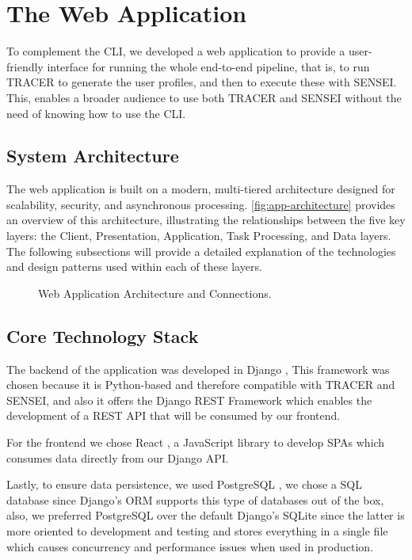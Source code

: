 \section{The Web Application}

To complement the \ac{CLI},
we developed a web application
to provide a user-friendly interface for running the whole end-to-end pipeline,
that is, to run \ac{TRACER} to generate the user profiles,
and then to execute these with SENSEI.
This, enables a broader audience to use both \ac{TRACER} and SENSEI
without the need of knowing how to use the \ac{CLI}.

\subsection{System Architecture}

The web application is built on a modern,
multi-tiered architecture designed for scalability, security, and asynchronous processing.
\autoref{fig:app-architecture} provides an overview of this architecture,
illustrating the relationships between the five key layers:
the Client, Presentation, Application, Task Processing, and Data layers.
The following subsections will provide a detailed explanation
of the technologies and design patterns used within each of these layers.

\begin{figure}[!htbp]
    \centering
    
    \caption{Web Application Architecture and Connections.}
    \label{fig:app-architecture}
\end{figure}

\subsection{Core Technology Stack}

The backend of the application was developed in Django \autocite{Django},
This framework was chosen because it is Python-based
and therefore compatible with \ac{TRACER} and SENSEI,
and also it offers the Django REST Framework \autocite{DjangoRESTFramework}
which enables the development of a \ac{REST} \ac{API}
that will be consumed by our frontend.

For the frontend we chose React \autocite{React},
a JavaScript library to develop \acp{SPA}
which consumes data directly from our Django \ac{API}.

Lastly, to ensure data persistence,
we used PostgreSQL \autocite{PostgreSQL2025},
we chose a \ac{SQL} database since Django's \ac{ORM} supports this type of databases out of the box,
also, we preferred PostgreSQL over the default Django's SQLite
since the latter is more oriented to development and testing
and stores everything in a single file which causes concurrency and performance issues when used in production.

